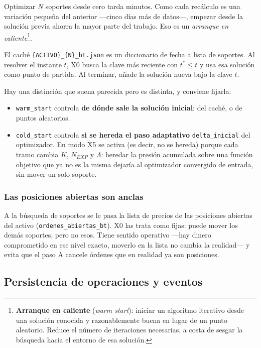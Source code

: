 \documentclass[11pt,a4paper]{article}
\newcommand{\code}[1]{\texttt{\small #1}}
\newcommand{\bigsep}{\par\vspace{3pt}}
\begin{document}
Optimizar $N$ soportes desde cero tarda minutos. Como cada recálculo es una variación
pequeña del anterior —cinco días más de datos—, empezar desde la solución previa ahorra la
mayor parte del trabajo. Eso es un \textit{arranque en caliente}\footnote{\textbf{Arranque
en caliente} (\textit{warm start}): iniciar un algoritmo iterativo desde una solución
conocida y razonablemente buena en lugar de un punto aleatorio. Reduce el número de
iteraciones necesarias, a costa de sesgar la búsqueda hacia el entorno de esa solución.}.

\bigsep
El caché \code{\{ACTIVO\}_\{N\}_bt.json} es un diccionario de fecha a lista de soportes. Al
resolver el instante $t$, X0 busca la clave más reciente con $t^* \le t$ y usa esa solución
como punto de partida. Al terminar, añade la solución nueva bajo la clave $t$.

\bigsep
Hay una distinción que suena parecida pero es distinta, y conviene fijarla:

\begin{itemize}[leftmargin=1.4em,itemsep=2pt]
\item \code{warm_start} controla \textbf{de dónde sale la solución inicial}: del caché, o de
puntos aleatorios.
\item \code{cold_start} controla \textbf{si se hereda el paso adaptativo} \code{delta_inicial}
del optimizador. En modo X5 se activa (es decir, no se hereda) porque cada tramo cambia $K$,
$N_{EXP}$ y $\Lambda$: heredar la presión acumulada sobre una función objetivo que ya no es
la misma dejaría al optimizador convergido de entrada, sin mover un solo soporte.
\end{itemize}

\subsubsection{Las posiciones abiertas son anclas}

A la búsqueda de soportes se le pasa la lista de precios de las posiciones abiertas del
activo (\code{ordenes_abiertas_bt}). X0 las trata como fijas: puede mover los demás soportes,
pero no esos. Tiene sentido operativo —hay dinero comprometido en ese nivel exacto, moverlo
en la lista no cambia la realidad— y evita que el paso A cancele órdenes que en realidad ya
son posiciones.

\subsection{Persistencia de operaciones y eventos}
\end{document}
